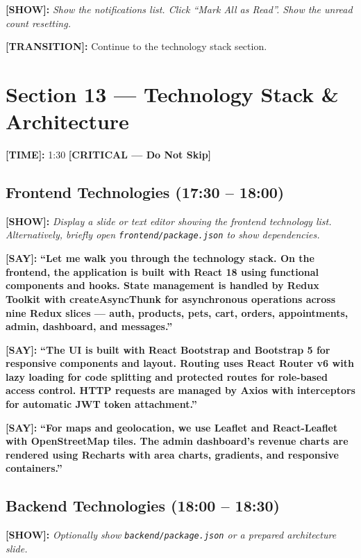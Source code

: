 \documentclass[12pt,a4paper]{article}
\newcommand{\say}[1]{\textbf{\textcolor{narration}{[SAY]:}} \textbf{``#1''}}
\newcommand{\show}[1]{\textbf{\textcolor{screen}{[SHOW]:}} \textit{#1}}
\newcommand{\timing}[1]{\textbf{\textcolor{timing}{[TIME]:}} #1}
\newcommand{\trans}[1]{\textbf{\textcolor{transition}{[TRANSITION]:}} #1}
\newcommand{\critical}{\textcolor{critical}{\textbf{[CRITICAL --- Do Not Skip]}}}
\begin{document}
\show{Show the notifications list. Click ``Mark All as Read''. Show the unread count resetting.}

\trans{Continue to the technology stack section.}

\newpage

\section{Section 13 --- Technology Stack \& Architecture}
\label{sec:tech}

\timing{1:30} \hfill \critical

\subsection{Frontend Technologies (17:30 -- 18:00)}

\show{Display a slide or text editor showing the frontend technology list. Alternatively, briefly open \texttt{frontend/package.json} to show dependencies.}

\say{Let me walk you through the technology stack. On the frontend, the application is built with \textbf{React 18} using functional components and hooks. State management is handled by \textbf{Redux Toolkit} with createAsyncThunk for asynchronous operations across nine Redux slices --- auth, products, pets, cart, orders, appointments, admin, dashboard, and messages.}

\say{The UI is built with \textbf{React Bootstrap} and \textbf{Bootstrap 5} for responsive components and layout. Routing uses \textbf{React Router v6} with lazy loading for code splitting and protected routes for role-based access control. HTTP requests are managed by \textbf{Axios} with interceptors for automatic JWT token attachment.}

\say{For maps and geolocation, we use \textbf{Leaflet} and \textbf{React-Leaflet} with OpenStreetMap tiles. The admin dashboard's revenue charts are rendered using \textbf{Recharts} with area charts, gradients, and responsive containers.}

\subsection{Backend Technologies (18:00 -- 18:30)}

\show{Optionally show \texttt{backend/package.json} or a prepared architecture slide.}
\end{document}
